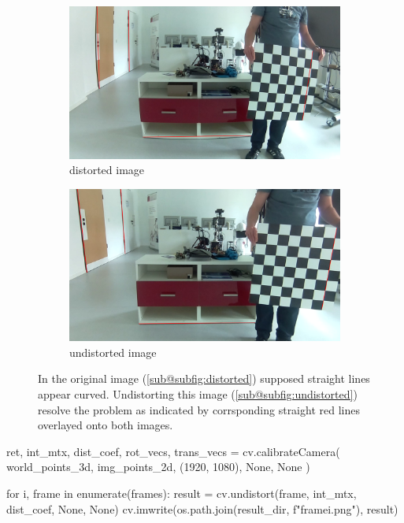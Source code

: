 \documentclass[bibliography=totoc]{scrartcl}
\begin{document}
\begin{figure}[H]
	\centering
	\begin{subfigure}[t]{0.45\linewidth}
		\includegraphics[width=\linewidth]{imgs/frame_11.png}
		\caption{distorted image}
		\label{subfig:distorted}
	\end{subfigure}
	\hspace{0.02\textwidth}
	\begin{subfigure}[t]{0.45\linewidth}
		\includegraphics[width=\linewidth]{imgs/frame11.png}
		\caption{undistorted image}
		\label{subfig:undistorted}
	\end{subfigure}
    \caption{In the original image (\ref{sub@subfig:distorted}) supposed straight lines appear curved. Undistorting this image (\ref{sub@subfig:undistorted}) resolve the problem as indicated by corrsponding straight red lines overlayed onto both images.}
	\label{fig:comparison}
\end{figure}

\begin{python}
ret, int_mtx, dist_coef, rot_vecs, trans_vecs = cv.calibrateCamera(
    world_points_3d, img_points_2d, (1920, 1080), None, None
)

for i, frame in enumerate(frames):
    result = cv.undistort(frame, int_mtx, dist_coef, None, None)
    cv.imwrite(os.path.join(result_dir, f"frame{i}.png"), result)
\end{python}
\end{document}
